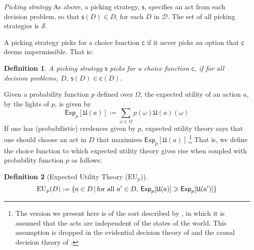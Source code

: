 \documentclass[a4paper]{article}
\newtheorem{definition}{Definition}
\newcommand\A{\mathcal{A}}
\newcommand\Exp{\mathsf{Exp}}
\newcommand\EU{\mathrm{EU}}
\newcommand\U{\mathfrak{U}} %
\newcommand{\D}{\mathcal{D}}
\renewcommand\S{\mathcal{S}}
\newcommand\s{\mathsf{s}}
\renewcommand\c{\mathsf{c}} %
\newcommand{\todoold}[2][]{\todo[backgroundcolor=white,bordercolor=orange!10,linecolor=gray!10, #1,caption={},textcolor=gray]{Pre-rev: #2}}
\newcommand{\todooldinfo}[2][]{\todoold[#1]{#2}}
\newcommand\SetDelimiter[1][]{
	\nonscript\,#1\vert \allowbreak \nonscript\,\mathopen{}}
\providecommand\given{\SetDelimiter}
\renewcommand{\emptyset}{\varnothing}
\renewcommand{\geq}{\geqslant}
\newenvironment{CCM rewritten}
{\begingroup\color{blue}} %
{\endgroup}              %
\begin{document}









\emph{Picking strategy } As above, a picking strategy, $\s$, specifies an act from each decision problem, so that $\s(D)\in D$, for each $D$ in $\D$. The set of all picking strategies is $\S$.

A picking strategy picks for a choice function $\c$ if it never picks an option that $\c$ deems impermissible. That is: 
\begin{definition}\label{def:picks for}
	A picking strategy $\s$ \emph{picks for a choice function} $\c$, if for all decision problems, $D$, $\s(D) \in \c(D)$.
\end{definition}


Given a probability function $p$ defined over $\Omega$, the expected utility of an action $a$, by the lights of $p$, is given by \begin{equation}
	\Exp_p [\U(a)]:=\sum_{\omega\in\Omega}p(\omega)\U(a)(\omega)
\end{equation}
If one has (probabilistic) credences given by $p$, expected utility theory says that one should choose an act in $D$ that maximises $\Exp_p[\U(a)]$.\footnote{The version we present here is of the sort described by \citet{savage1954fs}, in which it is assumed that the acts are independent of the states of the world. This assumption is dropped in the evidential decision theory of \citet{jeffrey1965lod} and the causal decision theory of \citet{stalnaker1972ldl, gibbard1978ctk, joyce1999fcdt}.} That is, we define the choice function to which expected utility theory gives rise when coupled with probability function $p$ as follows:

\begin{definition}[Expected Utility Theory ($\EU_p$)]\label{def:EU}
	\[\EU_p(D):=\{a\in D\given \text{for all $a'\in D$, }\Exp_p[\U(a)]\geq \Exp_p[\U(a')]\}\]
\end{definition}
\end{document}
